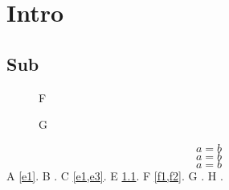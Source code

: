 \documentclass{article}
\begin{document}
\section{Intro}\label{s1}
\subsection{Sub}\label{s11}
\begin{figure}\caption{F}\label{f1}\end{figure}
\begin{figure}\caption{G}\label{f2}\end{figure}
\begin{equation}a=b\label{e1}\end{equation}
\begin{equation}a=b\label{e2}\end{equation}
\begin{equation}a=b\label{e3}\end{equation}
A \cref{e1}. B . C \cref{e1,e3}. E \cref{s11}. F \cref{f1,f2}. G . H .
\end{document}
